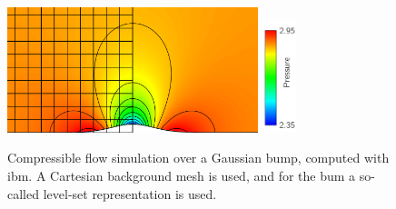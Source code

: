 \documentclass[a4paper,10pt]{report} %
\begin{document}
\begin{figure}[!h]
\begin{center}
\includegraphics[width=0.65\textwidth]{figures/FlowOverBump2}
\includegraphics[width=0.09\textwidth]{figures/FlowOverBump2-legend}
\end{center}
\caption{
Compressible flow simulation over a Gaussian bump,
computed with \ac{ibm}. A Cartesian background mesh is used, 
and for the bum a so-called level-set representation is used.
}
\label{fig:FlowOverBump}
\end{figure}
\end{document}
